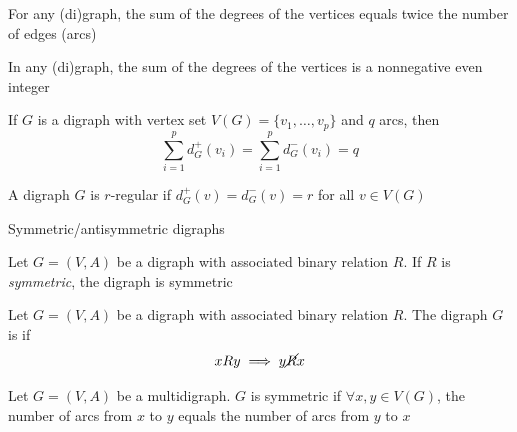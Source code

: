 \documentclass[aspectratio=43]{beamer}
\begin{document}
\begin{frame}
	\begin{theorem}
		For any (di)graph, the sum of the degrees of the vertices equals twice the number of edges (arcs)
	\end{theorem}
	\begin{corollary}
		In any (di)graph, the sum of the degrees of the vertices is a nonnegative even integer
	\end{corollary}
	\begin{theorem}
		If $G$ is a digraph with vertex set $V(G)=\{v_1, \dots , v_p\}$ and $q$ arcs, then $$\sum_{i=1}^p d^+_G(v_i)=\sum_{i=1}^p d^-_G(v_i)=q$$
	\end{theorem}
\end{frame}

\begin{frame}
	\begin{definition}
		A digraph $G$ is $r$-regular if $d_G^+(v)=d_G^-(v)=r$ for all $v\in V(G)$
\end{definition}\end{frame}

\begin{frame}{Symmetric/antisymmetric digraphs}
	\begin{definition}
		Let $G=(V,A)$ be a digraph with associated binary relation $R$.
		If $R$ is \emph{symmetric}, the digraph is symmetric
	\end{definition}
	\vfill
	\begin{definition}
		Let $G=(V,A)$ be a digraph with associated binary relation $R$.
		The digraph $G$ is  if
		\[
		xRy \implies y\cancel R x
		\]
	\end{definition}
	\vfill
	\begin{definition}
		Let $G=(V,A)$ be a multidigraph. $G$ is symmetric if $\forall x,y\in V(G)$, the number of arcs from $x$ to $y$ equals the number of arcs from $y$ to $x$
	\end{definition}
\end{frame}


\end{document}
